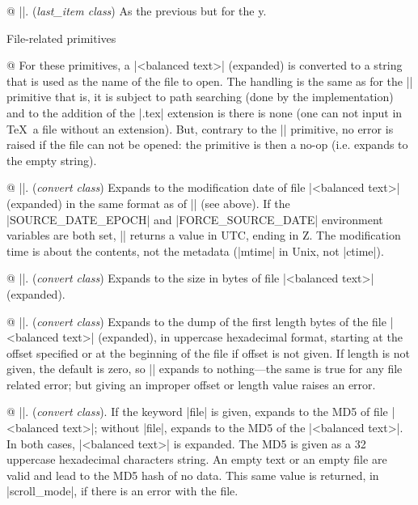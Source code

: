 @ |\lastypos|. ({\sl last\_item class})\enskip
As the previous but for the y.

\enddiv %

\vfil
\break
\begindiv File-related primitives

@ For these primitives, a |<balanced text>| (expanded) is converted
to a string that is used as the name of the file to open. The
handling is the same as for the || primitive
that is, it is subject to path searching (done by the implementation)
and to the addition of the |.tex| extension is there is
none (one can not input in \TeX\ a file without an extension). But,
contrary to the || primitive, no error is raised if the file can
not be opened: the primitive is then a no-op (i.e. expands to the
empty string).
 
@ ||. ({\sl convert class})\enskip
Expands to the modification date of file |<balanced text>| (expanded)
in the same format as of |\creationdate| (see above).
If the |SOURCE_DATE_EPOCH| and |FORCE_SOURCE_DATE| environment
variables are both set, |\filemoddate| returns a value in UTC,
ending in Z. The modification time is about the contents, not the
metadata (|mtime| in Unix, not |ctime|).


@ ||. ({\sl convert class})\enskip
Expands to the size in bytes of file |<balanced text>| (expanded).


@ ||.
({\sl convert class})\enskip
Expands to the dump of the first length bytes of the file |<balanced
text>| (expanded), in uppercase hexadecimal format, starting at the
offset specified or at the beginning of the file if offset is not given.
If length is not given, the default is zero, so |\filedump| expands to
nothing---the same is true for any file related error; but giving an
improper offset or length value raises an error.

@ ||. ({\sl convert class}).\enskip
If the keyword |file| is given, expands to the
MD5 of file |<balanced text>|; without |file|, expands to
the MD5 of the |<balanced text>|. In both cases, |<balanced text>| is
expanded. The MD5 is given as a 32 uppercase hexadecimal characters
string. An empty text or an empty file are valid and lead to the
MD5 hash of no data. This same value is returned, in |scroll_mode|,
if there is an error with the file.


